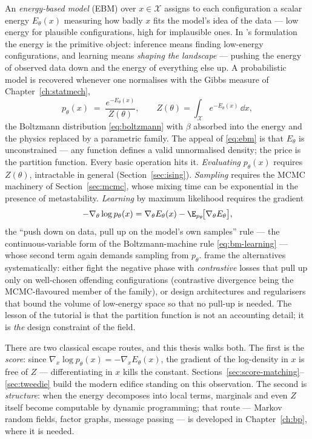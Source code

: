 An \emph{energy-based model} (EBM) over $x \in \mathcal{X}$ assigns to each
configuration a scalar energy $E_\theta(x)$ measuring how badly $x$ fits
the model's idea of the data --- low energy for plausible configurations,
high for implausible ones. In \citeauthor{lecun2006tutorial}'s formulation
the energy is the primitive object: inference means finding low-energy
configurations, and learning means \emph{shaping the landscape} --- pushing
the energy of observed data down and the energy of everything else up. A
probabilistic model is recovered whenever one normalises with the Gibbs
measure of Chapter~\ref{ch:statmech},
\begin{equation}
  p_\theta(x) \;=\; \frac{e^{-E_\theta(x)}}{Z(\theta)},
  \qquad
  Z(\theta) = \int_{\mathcal{X}} e^{-E_\theta(x)}\, \dd x ,
  \label{eq:ebm}
\end{equation}
the Boltzmann distribution \eqref{eq:boltzmann} with $\beta$ absorbed into
the energy and the physics replaced by a parametric family. The appeal of
\eqref{eq:ebm} is that $E_\theta$ is unconstrained --- any function defines
a valid unnormalised density; the price is the partition function. Every
basic operation hits it. \emph{Evaluating} $p_\theta(x)$ requires
$Z(\theta)$, intractable in general (Section~\ref{sec:ising}).
\emph{Sampling} requires the MCMC machinery of Section~\ref{sec:mcmc},
whose mixing time can be exponential in the presence of metastability.
\emph{Learning} by maximum likelihood requires the gradient
\begin{equation}
  -\nabla_\theta \log p_\theta(x)
  = \nabla_\theta E_\theta(x)
  - \E_{p_\theta}\!\big[ \nabla_\theta E_\theta \big],
  \label{eq:ebm-gradient}
\end{equation}
the ``push down on data, pull up on the model's own samples'' rule --- the
continuous-variable form of the Boltzmann-machine rule
\eqref{eq:bm-learning} --- whose second term again demands sampling from
$p_\theta$. \citet{lecun2006tutorial} frame the alternatives systematically:
either fight the negative phase with \emph{contrastive} losses that pull up
only on well-chosen offending configurations (contrastive divergence
\citep{hinton2002training} being the MCMC-flavoured member of the family),
or design architectures and regularisers that bound the volume of low-energy
space so that no pull-up is needed. The lesson of the tutorial is that the
partition function is not an accounting detail; it is \emph{the} design
constraint of the field.

There are two classical escape routes, and this thesis walks both. The
first is the \emph{score}: since
$\nabla_x \log p_\theta(x) = -\nabla_x E_\theta(x)$, the gradient of the
log-density in $x$ is free of $Z$ --- differentiating in $x$ kills the
constant. Sections~\ref{sec:score-matching}--\ref{sec:tweedie} build the
modern edifice standing on this observation. The second is
\emph{structure}: when the energy decomposes into local terms, marginals and
even $Z$ itself become computable by dynamic programming; that route ---
Markov random fields, factor graphs, message passing --- is developed in
Chapter~\ref{ch:bp}, where it is needed.

